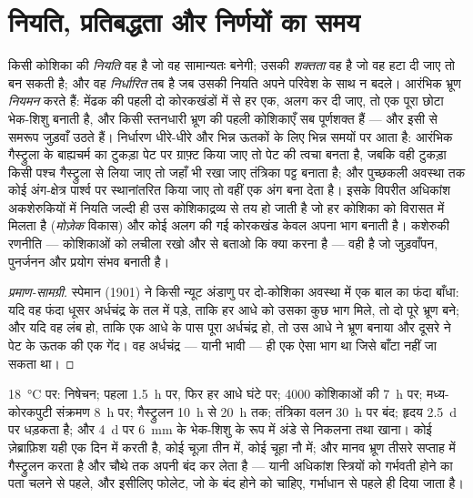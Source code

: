 \section{नियति, प्रतिबद्धता और निर्णयों का समय}

\begin{proposition}[कोई कोशिका की नियति कब तय होती है]\label{prop:b2:vertebrate-development:commitment}
किसी कोशिका की \emph{नियति} वह है जो वह सामान्यतः बनेगी; उसकी
\emph{शक्तता} वह है जो वह हटा दी जाए तो बन सकती है; और वह
\emph{निर्धारित} तब है जब उसकी नियति अपने परिवेश के साथ न बदले।
आरंभिक भ्रूण \emph{नियमन} करते हैं: मेंढक की पहली दो कोरकखंडों में से
हर एक, अलग कर दी जाए, तो एक पूरा छोटा भेक-शिशु बनाती है, और किसी
स्तनधारी भ्रूण की पहली कोशिकाएँ सब पूर्णशक्त हैं --- और इसी से
समरूप जुड़वाँ उठते हैं। निर्धारण धीरे-धीरे और भिन्न ऊतकों के लिए भिन्न
समयों पर आता है: आरंभिक गैस्ट्रुला के बाह्यचर्म का टुकड़ा पेट पर
ग्राफ़्ट किया जाए तो पेट की त्वचा बनता है, जबकि वही टुकड़ा किसी पश्च
गैस्ट्रुला से लिया जाए तो जहाँ भी रखा जाए तंत्रिका पट्ट बनाता है;
और पुच्छकली अवस्था तक कोई अंग-क्षेत्र पार्श्व पर स्थानांतरित किया जाए तो
वहीं एक अंग बना देता है। इसके विपरीत अधिकांश अकशेरुकियों में नियति जल्दी
ही उस कोशिकाद्रव्य से तय हो जाती है जो हर कोशिका को विरासत में मिलता है
(\emph{मोज़ेक} विकास) और कोई अलग की गई कोरकखंड केवल अपना भाग बनाती है।
कशेरुकी रणनीति --- कोशिकाओं को लचीला रखो और  से बताओ कि क्या करना
है --- वही है जो जुड़वाँपन, पुनर्जनन और  प्रयोग
संभव बनाती है।
\end{proposition}
\begin{proof}[प्रमाण-सामग्री]
स्पेमान (1901) ने किसी न्यूट अंडाणु पर दो-कोशिका अवस्था में एक बाल का
फंदा बाँधा: यदि वह फंदा धूसर अर्धचंद्र के तल में पड़े, ताकि
हर आधे को उसका कुछ भाग मिले, तो दो पूरे भ्रूण बने; और यदि वह लंब हो,
ताकि एक आधे के पास पूरा अर्धचंद्र हो, तो उस आधे ने भ्रूण बनाया और दूसरे
ने पेट के ऊतक की एक गेंद। वह अर्धचंद्र --- यानी भावी  --- ही एक ऐसा
भाग था जिसे बाँटा नहीं जा सकता था।
\end{proof}

\begin{example}[किसी मेंढक की समय-सारणी]\label{ex:b2:vertebrate-development:timetable}
\qty{18}{\celsius} पर: निषेचन; पहला  \qty{1.5}{h} पर,
फिर हर आधे घंटे पर; \num{4000} कोशिकाओं की  \qty{7}{h} पर;
मध्य-कोरकपुटी संक्रमण \qty{8}{h} पर; गैस्ट्रुलन \qty{10}{h} से
\qty{20}{h} तक; तंत्रिका वलन \qty{30}{h} पर बंद; हृदय \qty{2.5}{d} पर
धड़कता है; और \qty{4}{d} पर \qty{6}{mm} के भेक-शिशु के रूप में
अंडे से निकलना तथा खाना। कोई ज़ेब्राफ़िश यही एक दिन में करती है, कोई
चूज़ा तीन में, कोई चूहा नौ में; और मानव भ्रूण तीसरे सप्ताह में
गैस्ट्रुलन करता है और चौथे तक अपनी  बंद कर लेता है ---
यानी अधिकांश स्त्रियों को गर्भवती होने का पता चलने से पहले, और इसीलिए
फोलेट, जो  के बंद होने को चाहिए, गर्भाधान से पहले ही दिया
जाता है।
\end{example}

